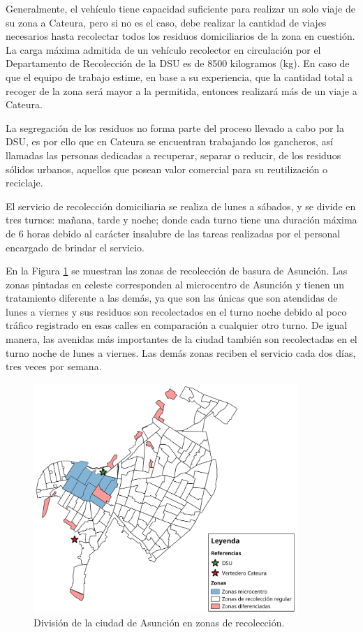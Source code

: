 Generalmente, el vehículo tiene capacidad suficiente para realizar un solo viaje de su zona a Cateura, pero si no es el caso, debe realizar la cantidad de viajes necesarios hasta recolectar todos los residuos domiciliarios de la zona en cuestión. La carga máxima admitida de un vehículo recolector en circulación por el Departamento de Recolección de la DSU es de 8500 kilogramos (kg). En caso de que el equipo de trabajo estime, en base a su experiencia, que la cantidad total a recoger de la zona será mayor a la permitida, entonces realizará más de un viaje a Cateura.

La segregación de los residuos no forma parte del proceso llevado a cabo por la DSU, es por ello que en Cateura se encuentran trabajando los gancheros, así llamadas las personas dedicadas a recuperar, separar o reducir, de los residuos sólidos urbanos, aquellos que posean valor comercial para su reutilización o reciclaje.

El servicio de recolección domiciliaria se realiza de lunes a sábados, y se divide en tres turnos: mañana, tarde y noche; donde cada turno tiene una duración máxima de 6 horas debido al carácter insalubre de las tareas realizadas por el personal encargado de brindar el servicio.

En la Figura \ref{fig:zonasRecoleccion} se muestran las zonas de recolección de basura de Asunción. Las zonas pintadas en celeste corresponden al microcentro de Asunción y tienen un tratamiento diferente a las demás, ya que son las únicas que son atendidas de lunes a viernes y sus residuos son recolectados en el turno noche debido al poco tráfico registrado en esas calles en comparación a cualquier otro turno. De igual manera, las avenidas más importantes de la ciudad también son recolectadas en el turno noche de lunes a viernes. Las demás zonas reciben el servicio cada dos días, tres veces por semana.

\begin{figure}[H]
    \centering
    \includegraphics[width=10cm]{Recoleccion-ZONAS_CUADRANTES.png}
    \caption{División de la ciudad de Asunción en zonas de recolección.}
    \label{fig:zonasRecoleccion}
\end{figure}


